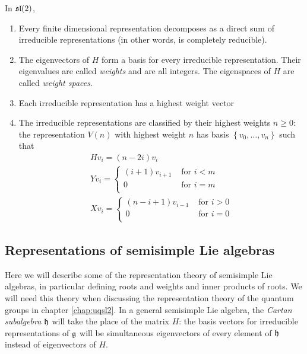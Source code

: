 In $\mathfrak{sl}(2)$,
\begin{enumerate}
    \item Every finite dimensional representation decomposes as a direct sum of
          irreducible representations (in other words, is completely reducible).
    \item The eigenvectors of $H$ form a basis for every irreducible
          representation. Their eigenvalues are called \emph{weights} and are
          all integers. The eigenspaces of $H$ are called \emph{weight spaces}.  
    \item Each irreducible representation has a highest weight vector
    \item The irreducible representations are classified by their highest
          weights $n \geq 0$: the representation $V(n)$ with highest weight $n$
          has basis $\left\{ v_0, \ldots, v_n \right\}$ such that 
\begin{align*}
    &H v_i = (n - 2i) v_i& \\
    &Y v_i = \begin{cases} 
                (i+1)v_{i+1}& \text{ for $i < m$} \\
                0& \text{ for $i = m$} \\
            \end{cases} \\
    &X v_i = \begin{cases} 
                (n-i+1)v_{i-1}& \text{ for $i > 0$} \\
                0& \text{ for $i = 0$} \\
            \end{cases}
\end{align*}
\end{enumerate}




\subsection{Representations of semisimple Lie algebras}

Here we will describe some of the representation theory of semisimple Lie
algebras, in particular defining roots and weights and inner products of roots.
We will need this theory when discussing the representation theory of the
quantum groups in chapter \ref{chap:uqsl2}. 
In a general semisimple Lie algebra, the \emph{Cartan subalgebra}
$\mathfrak{h}$ will take the place of the matrix $H$: the basis vectors for
irreducible representations of $\mathfrak{g}$ will be simultaneous eigenvectors of
every element of $\mathfrak{h}$ instead of eigenvectors of $H$.

